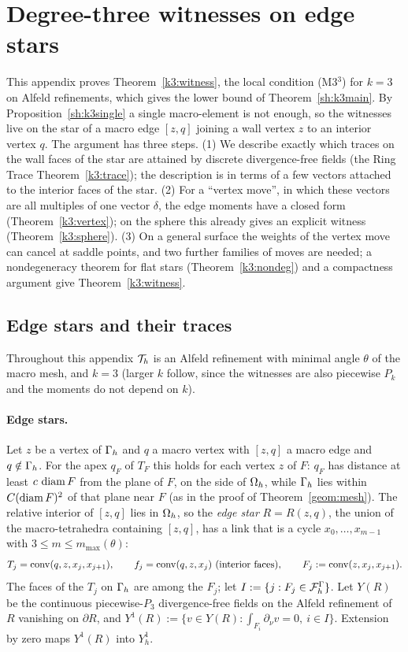 \section{Degree-three witnesses on edge stars}\label{app:k3}\label{sh:sec:k3}

This appendix proves Theorem~\ref{k3:witness}, the local condition (M3$^3$) for $k=3$ on Alfeld refinements, which gives the lower bound of Theorem~\ref{sh:k3main}. By Proposition~\ref{sh:k3single} a single macro-element is not enough, so the witnesses live on the star of a macro edge $[z,q]$ joining a wall vertex $z$ to an interior vertex $q$. The argument has three steps. (1) We describe exactly which traces on the wall faces of the star are attained by discrete divergence-free fields (the Ring Trace Theorem~\ref{k3:trace}); the description is in terms of a few vectors attached to the interior faces of the star. (2) For a ``vertex move'', in which these vectors are all multiples of one vector $\delta$, the edge moments have a closed form (Theorem~\ref{k3:vertex}); on the sphere this already gives an explicit witness (Theorem~\ref{k3:sphere}). (3) On a general surface the weights of the vertex move can cancel at saddle points, and two further families of moves are needed; a nondegeneracy theorem for flat stars (Theorem~\ref{k3:nondeg}) and a compactness argument give Theorem~\ref{k3:witness}.

\subsection{Edge stars and their traces}
Throughout this appendix $\mathcal T_h$ is an Alfeld refinement with minimal angle $\theta$ of the macro mesh, and $k=3$ (larger $k$ follow, since the witnesses are also piecewise $P_k$ and the moments do not depend on $k$).

\paragraph{Edge stars.} Let $z$ be a vertex of $\Gamma_h$ and $q$ a macro vertex with $[z,q]$ a macro edge and $q\notin\Gamma_h$. For the apex $q_F$ of $T_F$ this holds for each vertex $z$ of $F$: $q_F$ has distance at least $c\,\operatorname{diam} F$ from the plane of $F$, on the side of $\Omega_h$, while $\Gamma_h$ lies within $C(\operatorname{diam} F)^2$ of that plane near $F$ (as in the proof of Theorem~\ref{geom:mesh}). The relative interior of $[z,q]$ lies in $\Omega_h$, so the \emph{edge star} $R=R(z,q)$, the union of the macro-tetrahedra containing $[z,q]$, has a link that is a cycle $x_0,\dots,x_{m-1}$ with $3\le m\le m_{\max}(\theta)$:
\[
T_j=\operatorname{conv}(q,z,x_j,x_{j+1}),\qquad f_j=\operatorname{conv}(q,z,x_j)\ \text{(interior faces)},\qquad F_j:=\operatorname{conv}(z,x_j,x_{j+1}).
\]
The faces of the $T_j$ on $\Gamma_h$ are among the $F_j$; let $I:=\{j:F_j\in\mathcal F_h^\Gamma\}$. Let $Y(R)$ be the continuous piecewise-$P_3$ divergence-free fields on the Alfeld refinement of $R$ vanishing on $\partial R$, and $Y^1(R):=\{v\in Y(R):\int_{F_i}\partial_\nu v=0,\ i\in I\}$. Extension by zero maps $Y^1(R)$ into $Y_h^1$.

